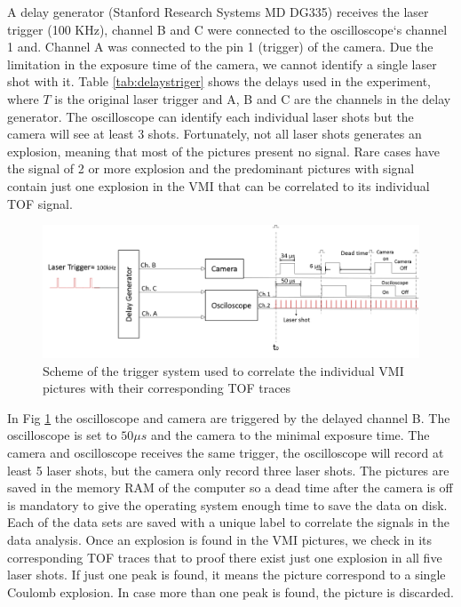 A delay generator (Stanford Research Systems MD DG335) receives the laser trigger (100 KHz), channel B and C were connected to the oscilloscope`s channel 1 and. Channel A was connected to the pin 1 (trigger) of the camera. Due the limitation in the exposure time of the camera, we cannot identify a single laser shot with it. Table \ref{tab:delaystriger} shows the delays used in the experiment, where $T$ is the original laser trigger and A, B and C are the channels in the delay generator. The oscilloscope can identify each individual laser shots but the camera will see at least 3 shots. Fortunately, not all laser shots generates an explosion, meaning that most of the pictures present no signal. Rare cases have the signal of 2 or more explosion and the predominant pictures with signal contain just one explosion in the VMI that can be correlated to its individual TOF signal. 

\begin{figure}[h!]

\centering
\includegraphics[width = 14 cm]{../Images/Trigger scheme.png}
\caption[Trigger Scheme]{Scheme of the trigger system used to correlate the individual VMI pictures with their corresponding TOF traces }
\label{fig:triggers}
\end{figure}

In Fig \ref{fig:triggers} the oscilloscope and camera are triggered by the delayed channel B. The oscilloscope is set to $50\mu s$ and the camera to the minimal exposure time. The camera and oscilloscope receives the same trigger, the oscilloscope will record at least 5 laser shots, but the camera only record three laser shots. The pictures are saved in the memory RAM of the computer so a dead time after the camera is off is mandatory to give the operating system enough time to save the data on disk. Each of the data sets are saved with a unique label to correlate the signals in the data analysis. Once an explosion is found in the VMI pictures, we check in its corresponding TOF traces that to proof there exist just one explosion in all five laser shots. If just one peak is found, it means the picture correspond to a single Coulomb explosion. In case more than one peak is found, the picture is discarded. 

